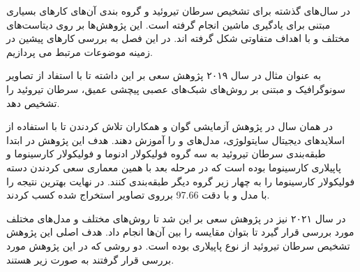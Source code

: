 در سال‌های گذشته برای تشخیص سرطان تیروئید و گروه بندی آن‌های کارهای بسیاری مبتنی برای یادگیری ماشین انجام گرفته است. این پژوهش‌ها بر روی دیتاست‌های مختلف و با اهداف متفاوتی شکل گرفته اند. در این فصل به بررسی کارهای پیشین در زمینه موضوعات مرتبط می پردازیم.

به عنوان مثال در سال ۲۰۱۹ پژوهش \cite{li2019diagnosis} سعی بر این داشته تا با استفاد از تصاویر سونوگرافیک و مبتنی بر روش‌های شبک‌های عصبی پیچشی عمیق، سرطان تیروئید را تشخیص دهد.

در همان سال در پژوهش آزمایشی \cite{guan2019deep} گوان و همکاران تلاش کردندن تا با استفاده از اسلاید‌های دیجیتال سایتولوژی، مدل‌های  و  را آموزش دهند. هدف این پژوهش در ابتدا طبقه‌بندی سرطان تیروئید به سه گروه فولیکولار ادنوما و فولیکولار کارسینوما و پاپیلاری کارسینوما بوده است که در مرحله بعد با همین معماری سعی کردندن دسته فولیکولار کارسینوما را به چهار زیر گروه دیگر طبقه‌بندی کنند. در نهایت بهترین نتیجه را با مدل  و با دقت 97.66 برروی تصاویر استخراج شده کسب کردند.

در سال ۲۰۲۱ نیز در پژوهش \cite{bohland2021machine} سعی بر این شد تا روش‌های مختلف و مدل‌های مختلف مورد بررسی قرار گیرد تا بتوان مقایسه را بین آن‌ها انجام داد. هدف اصلی این پژوهش تشخیص سرطان تیروئید از نوع پاپیلاری بوده است. دو روشی که در این پژوهش مورد بررسی قرار گرفتند به صورت زیر هستند.

